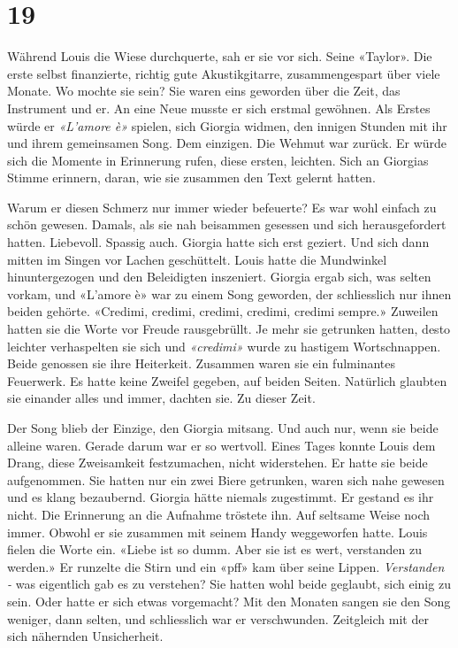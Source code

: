 \chapter{19}


Während Louis die Wiese durchquerte, sah er sie vor sich. Seine
«Taylor». Die erste selbst finanzierte, richtig gute Akustikgitarre,
zusammengespart über viele Monate. Wo mochte sie sein?
Sie waren eins geworden über die Zeit, das Instrument und er.
An eine Neue  musste er sich erstmal gewöhnen. Als Erstes würde er \emph{«L’amore è»} spielen, sich Giorgia widmen, den innigen Stunden mit ihr und ihrem gemeinsamen Song. Dem einzigen. Die Wehmut war zurück. Er würde sich die Momente in Erinnerung rufen, diese ersten, leichten. Sich an Giorgias Stimme erinnern, daran, wie sie zusammen den Text gelernt hatten.


Warum er diesen Schmerz nur immer wieder befeuerte? Es war wohl
einfach zu schön gewesen. Damals, als sie nah beisammen gesessen und
sich herausgefordert hatten. Liebevoll. Spassig auch. 
Giorgia hatte sich erst geziert. Und sich dann mitten im Singen vor
Lachen geschüttelt. Louis hatte die Mundwinkel hinuntergezogen und den
Beleidigten inszeniert. Giorgia ergab sich, was selten vorkam, und
«L’amore è» war zu einem Song geworden, der schliesslich nur
ihnen beiden gehörte.
«Credimi, credimi, credimi, credimi, credimi sempre.»
Zuweilen hatten sie die Worte vor Freude rausgebrüllt.
Je mehr sie getrunken hatten, desto leichter verhaspelten sie sich und
\emph{«credimi»} wurde zu hastigem Wortschnappen. Beide genossen sie
ihre Heiterkeit. Zusammen waren sie ein fulminantes Feuerwerk.
Es hatte keine Zweifel gegeben, auf beiden Seiten. Natürlich glaubten
sie einander alles und immer, dachten sie. Zu dieser Zeit.

Der Song blieb der Einzige, den Giorgia mitsang. Und auch nur, wenn sie
beide alleine waren. Gerade darum war er so wertvoll. Eines Tages konnte
Louis dem Drang, diese Zweisamkeit festzumachen, nicht widerstehen.
Er hatte sie beide aufgenommen. Sie hatten nur ein zwei
Biere getrunken, waren sich nahe gewesen und es klang bezaubernd.
Giorgia hätte niemals zugestimmt. Er gestand es ihr nicht. 
Die Erinnerung an die Aufnahme tröstete ihn. Auf seltsame Weise noch
immer. Obwohl er sie zusammen mit seinem Handy weggeworfen hatte.
Louis fielen die Worte ein.
«Liebe ist so dumm. Aber sie ist es wert, verstanden zu werden.» Er runzelte die Stirn und ein «pff» kam über seine Lippen.
\emph{Verstanden - } was eigentlich gab es zu verstehen? Sie hatten wohl
beide geglaubt, sich einig zu sein. Oder hatte er sich etwas vorgemacht? 
Mit den Monaten sangen sie den Song weniger, dann selten, und
schliesslich war er verschwunden. Zeitgleich mit der sich nähernden Unsicherheit.

